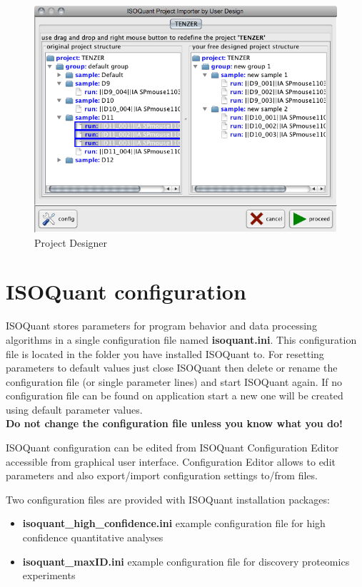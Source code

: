 \documentclass[]{article}
\providecommand{\tightlist}{%
  \setlength{\itemsep}{0pt}\setlength{\parskip}{0pt}}
\begin{document}
\begin{figure}[htbp]
\centering
\includegraphics{pic/project_designer.png}
\caption{Project Designer \label{pic:ProjectDesigner}}
\end{figure}

\section{ISOQuant configuration}\label{isoquant-configuration}

ISOQuant stores parameters for program behavior and data processing
algorithms in a single configuration file named \textbf{isoquant.ini}.
This configuration file is located in the folder you have installed
ISOQuant to. For resetting parameters to default values just close
ISOQuant then delete or rename the configuration file (or single
parameter lines) and start ISOQuant again. If no configuration file can
be found on application start a new one will be created using default
parameter values.\\
\textbf{Do not change the configuration file unless you know what you
do!}

ISOQuant configuration can be edited from ISOQuant Configuration Editor
accessible from graphical user interface. Configuration Editor allows to
edit parameters and also export/import configuration settings to/from
files.

Two configuration files are provided with ISOQuant installation
packages:

\begin{itemize}
\tightlist
\item
  \textbf{isoquant\_high\_confidence.ini} example configuration file for
  high confidence quantitative analyses
\item
  \textbf{isoquant\_maxID.ini} example configuration file for discovery
  proteomics experiments
\end{itemize}
\end{document}
